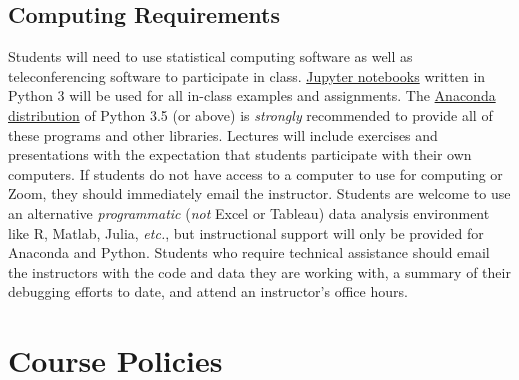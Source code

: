 \documentclass[10pt]{memoir}
\begin{document}

\subsection{Computing Requirements}
Students will need to use statistical computing software as well as teleconferencing software to participate in class. \href{http://jupyter.org/}{Jupyter notebooks} written in Python 3 will be used for all in-class examples and assignments. The \href{https://www.continuum.io/why-anaconda}{Anaconda distribution} of Python 3.5 (or above) is \textit{strongly} recommended to provide all of these programs and other libraries. Lectures will include exercises and presentations with the expectation that students participate with their own computers. If students do not have access to a computer to use for computing or Zoom, they should immediately email the instructor. Students are welcome to use an alternative \textit{programmatic} (\textit{not} Excel or Tableau) data analysis environment like R, Matlab, Julia, \textit{etc.}, but instructional support will only be provided for Anaconda and Python. Students who require technical assistance should email the instructors with the code and data they are working with, a summary of their debugging efforts to date, and attend an instructor's office hours.


\section{Course Policies}

\end{document}
